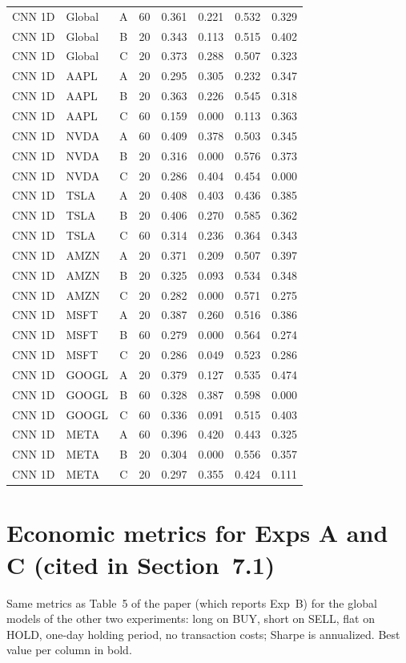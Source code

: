 \documentclass[10pt]{article}
\begin{document}
{\begin{longtable}{@{}l l c c c c c c@{}}
\midrule
CNN 1D & Global & A & 60 & 0.361 & 0.221 & 0.532 & 0.329 \\
CNN 1D & Global & B & 20 & 0.343 & 0.113 & 0.515 & 0.402 \\
CNN 1D & Global & C & 20 & 0.373 & 0.288 & 0.507 & 0.323 \\
CNN 1D & AAPL & A & 20 & 0.295 & 0.305 & 0.232 & 0.347 \\
CNN 1D & AAPL & B & 20 & 0.363 & 0.226 & 0.545 & 0.318 \\
CNN 1D & AAPL & C & 60 & 0.159 & 0.000 & 0.113 & 0.363 \\
CNN 1D & NVDA & A & 60 & 0.409 & 0.378 & 0.503 & 0.345 \\
CNN 1D & NVDA & B & 20 & 0.316 & 0.000 & 0.576 & 0.373 \\
CNN 1D & NVDA & C & 20 & 0.286 & 0.404 & 0.454 & 0.000 \\
CNN 1D & TSLA & A & 20 & 0.408 & 0.403 & 0.436 & 0.385 \\
CNN 1D & TSLA & B & 20 & 0.406 & 0.270 & 0.585 & 0.362 \\
CNN 1D & TSLA & C & 60 & 0.314 & 0.236 & 0.364 & 0.343 \\
CNN 1D & AMZN & A & 20 & 0.371 & 0.209 & 0.507 & 0.397 \\
CNN 1D & AMZN & B & 20 & 0.325 & 0.093 & 0.534 & 0.348 \\
CNN 1D & AMZN & C & 20 & 0.282 & 0.000 & 0.571 & 0.275 \\
CNN 1D & MSFT & A & 20 & 0.387 & 0.260 & 0.516 & 0.386 \\
CNN 1D & MSFT & B & 60 & 0.279 & 0.000 & 0.564 & 0.274 \\
CNN 1D & MSFT & C & 20 & 0.286 & 0.049 & 0.523 & 0.286 \\
CNN 1D & GOOGL & A & 20 & 0.379 & 0.127 & 0.535 & 0.474 \\
CNN 1D & GOOGL & B & 60 & 0.328 & 0.387 & 0.598 & 0.000 \\
CNN 1D & GOOGL & C & 60 & 0.336 & 0.091 & 0.515 & 0.403 \\
CNN 1D & META & A & 60 & 0.396 & 0.420 & 0.443 & 0.325 \\
CNN 1D & META & B & 20 & 0.304 & 0.000 & 0.556 & 0.357 \\
CNN 1D & META & C & 20 & 0.297 & 0.355 & 0.424 & 0.111 \\
\end{longtable}}

\section{Economic metrics for Exps A and C (cited in Section~7.1)}
Same metrics as Table~5 of the paper (which reports Exp~B) for the global models of the other two
experiments: long on BUY, short on SELL, flat on HOLD, one-day holding period, no transaction
costs; Sharpe is annualized. Best value per column in bold.
\end{document}
